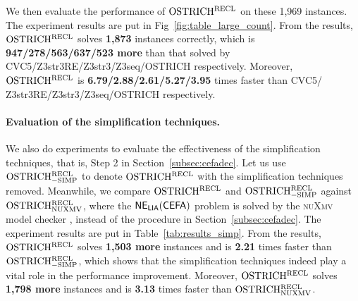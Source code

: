 We then evaluate the performance of $\rm OSTRICH^{RECL}$ on these 1,969 instances. 
The experiment results are put in Fig~\ref{fig:table_large_count}. From the results, $\rm OSTRICH^{RECL}$ solves \textbf{1,873} instances correctly, which is \textbf{947/278/563/637/523 more} than that solved by CVC5/Z3str3RE/Z3str3/Z3seq/OSTRICH respectively. Moreover, $\rm OSTRICH^{RECL}$ is \textbf{ 6.79/2.88/2.61/5.27/3.95} times faster than CVC5/ Z3str3RE/Z3str3/Z3seq/OSTRICH respectively.
\vspace{-2mm}


\paragraph*{Evaluation of the simplification techniques.}
We also do experiments to evaluate the effectiveness of the simplification techniques, that is, Step 2 in Section~\ref{subsec:cefadec}. 
Let us use $\rm OSTRICH^{RECL}_{\rm -SIMP}$ to denote $\rm OSTRICH^{RECL}$ with the simplification techniques removed. 
Meanwhile, we compare $\rm OSTRICH^{RECL}$ and $\rm OSTRICH^{RECL}_{\rm -SIMP}$ against $\rm OSTRICH^{RECL}_{\rm NUXMV}$, where the ${\sf NE_{LIA}(CEFA)}$ problem is solved by the \textsc{nuXmv} model checker \cite{nuxmv}, instead of the procedure in Section~\ref{subsec:cefadec}. 
The experiment results are put in Table~\ref{tab:results_simp}. 
From the results, $\rm OSTRICH^{RECL}$ solves \textbf{1,503 more} instances and is \textbf{2.21} times faster than $\rm OSTRICH^{RECL}_{\rm -SIMP}$, which shows that the simplification techniques indeed play a vital role in the performance improvement. Moreover, $\rm OSTRICH^{RECL}$ solves \textbf{1,798 more} instances and is \textbf{3.13} times faster than $\rm OSTRICH^{RECL}_{\rm NUXMV}$. 







